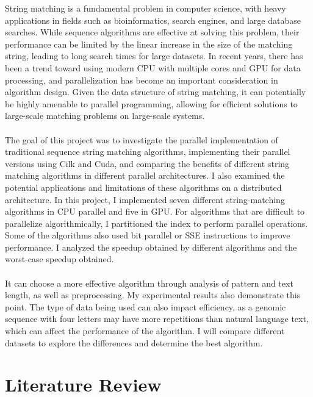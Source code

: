 \documentclass[11pt]{article}       %
\begin{document}
String matching is a fundamental problem in computer science, with heavy applications in fields such as bioinformatics, search engines, and large database searches. While sequence algorithms are effective at solving this problem, their performance can be limited by the linear increase in the size of the matching string, leading to long search times for large datasets. In recent years, there has been a trend toward using modern CPU with multiple cores and GPU for data processing, and parallelization has become an important consideration in algorithm design. Given the data structure of string matching, it can potentially be highly amenable to parallel programming, allowing for efficient solutions to large-scale matching problems on large-scale systems.\\
\\The goal of this project was to investigate the parallel implementation of traditional sequence string matching algorithms, implementing their parallel versions using Cilk and Cuda, and comparing the benefits of different string matching algorithms in different parallel architectures. I also examined the potential applications and limitations of these algorithms on a distributed architecture. In this project, I implemented seven different string-matching algorithms in CPU parallel and five in GPU. For algorithms that are difficult to parallelize algorithmically, I partitioned the index to perform parallel operations. Some of the algorithms also used bit parallel or SSE instructions to improve performance. I analyzed the speedup obtained by different algorithms and the worst-case speedup obtained.\\ 
\\It can choose a more effective algorithm through analysis of pattern and text length, as well as preprocessing. My experimental results also demonstrate this point. The type of data being used can also impact efficiency, as a genomic sequence with four letters may have more repetitions than natural language text, which can affect the performance of the algorithm. I will compare different datasets to explore the differences and determine the best algorithm.\\

\section{Literature Review} \label{litrev}
\end{document}
